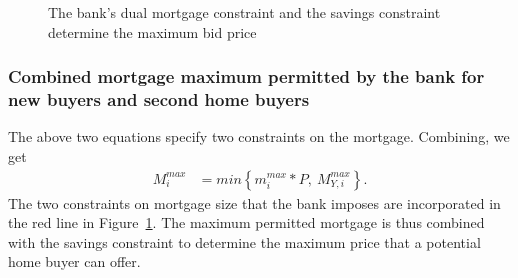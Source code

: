 {  \begin{figure}
    \centering
    
    \caption{The bank's dual mortgage constraint and the savings constraint determine the maximum bid price}
    \label{fig:dual-constraint}
    \end{figure}

\subsubsection{Combined mortgage maximum permitted by the bank for new buyers and second home buyers}

The above  two equations specify two constraints on the mortgage.  Combining, we get 
\begin{align} 
M_i^{max} &= min \left\{ m_i^{max}*P, \ M^{max}_{Y,i} \right\}. 
\label{eqn-max-mortgage-combined}
\end{align}
The two constraints on  mortgage size that the bank imposes are incorporated in the  red line in Figure~\ref{fig:dual-constraint}. The maximum  permitted mortgage is thus combined with the savings constraint to determine the maximum price that a potential home buyer can offer.%


}
